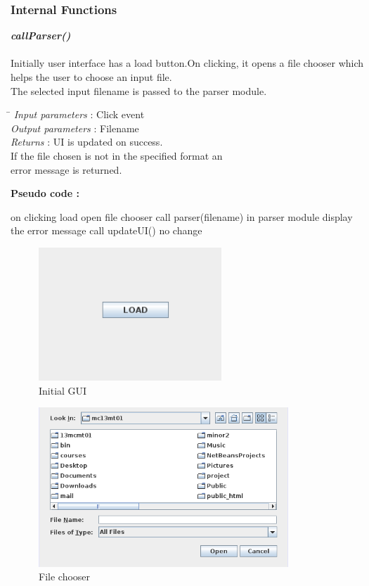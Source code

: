 \documentclass[a4paper,11pt]{article}
\begin{document}
\subsubsection{Internal Functions}
\emph{\bf callParser()}\\\\
Initially user interface has a load button.On clicking, it opens a file chooser which helps  the user to choose an input file.
\\ 
The selected input filename is passed to the parser module. \\
\begin{tabbing}
\hspace*{4cm}\= \kill
\emph{Input parameters} \>: Click event \\
\emph{Output parameters} \>: Filename \\
\emph{Returns} \>: UI is updated on success.\\ \>If the file chosen is not in the  specified format an\\ \> error message is returned.\\
\end{tabbing}
\textbf{Pseudo code :}
\begin{algorithmic}[1]
 \STATE on clicking load
 \STATE open file chooser
  \STATE call parser(filename) in parser module
  \STATE display the error message
  \ENDIF
  \STATE call updateUI()
  \ELSE 
  \STATE no change
  \ENDIF
 \end{algorithmic}
\begin{figure}[ht!]
\centering
\includegraphics[height=5cm]{images/1.png}
\caption{Initial GUI}
\end{figure}
\begin{figure}[h]
\centering
\includegraphics[height=6cm]{images/2.png}
\caption{File chooser}
\end{figure}
\end{document}
